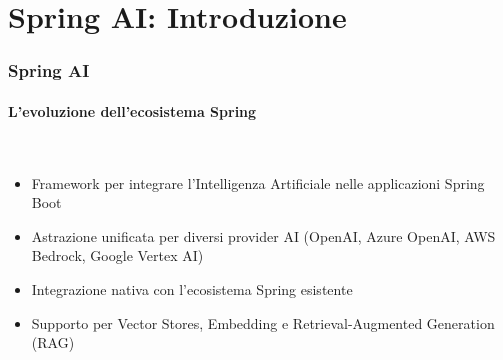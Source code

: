 \section{Spring AI: Introduzione} %
\label{sec:spring_ai_intro}
%
\begin{frame}[t,fragile] \frametitle{Spring AI}
	{\scriptsize
		\onslide<1->
            \framesubtitle{L'evoluzione dell'ecosistema Spring}
            \vspace*{-15pt}
            \begin{minipage}[t]{\textwidth}
            \end{minipage}
            \\\vspace*{3pt}
	    	\begin{minipage}[t]{\textwidth}
				\begin{minipage}[t]{0.6\textwidth}
	    			\begin{itemize}[leftmargin=10pt,align=right]
						\onslide<2->\item[\alert{\faArrowCircleRight}] Framework per \alert{integrare l'Intelligenza Artificiale} nelle applicazioni Spring Boot
						\onslide<3->\item[\alert{\faArrowCircleRight}] \alert{Astrazione unificata} per diversi provider AI (OpenAI, Azure OpenAI, AWS Bedrock, Google Vertex AI)
						\onslide<4->\item[\alert{\faArrowCircleRight}] Integrazione \alert{nativa} con l'ecosistema Spring esistente
						\onslide<5->\item[\alert{\faArrowCircleRight}] Supporto per \alert{Vector Stores}, \alert{Embedding} e \alert{Retrieval-Augmented Generation (RAG)}
					\end{itemize}
            	\end{minipage}
            	\begin{minipage}[t]{0.4\textwidth}
            	\end{minipage}
	    	\end{minipage}
	}
\end{frame}
